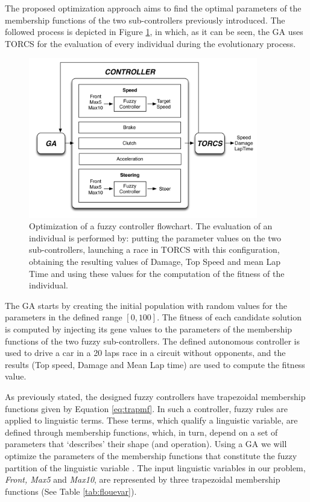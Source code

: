 \documentclass[conference]{IEEEtran}
\begin{document}
The proposed optimization approach aims to find the optimal parameters of the membership functions of the two sub-controllers previously introduced. 
The followed process is depicted in Figure \ref{fig:ga}, in which, as it can be seen, the GA uses TORCS for the evaluation of every individual during the evolutionary process.
\begin{figure}[!ht]
  \label{fig:ga}
  \begin{center}
    \includegraphics[width=10cm]{fig/flowchart}
  \end{center}
  \caption{Optimization of a fuzzy controller flowchart. The evaluation of an individual is performed by: putting the parameter values on the two sub-controllers, launching a race in TORCS with this configuration, obtaining the resulting values of Damage, Top Speed and mean Lap Time and using these values for the computation of the fitness of the individual.}
\end{figure}	
The GA starts by creating the initial population with random values
for the parameters in the defined range $[0,100]$. The fitness of each
candidate solution is computed by injecting its gene values to the
parameters of the membership functions of the two fuzzy
sub-controllers. The defined autonomous controller is used to drive a
car in a 20 laps race in a circuit without opponents, and the
results (Top speed, Damage and Mean Lap time) are used to compute the
fitness value. 


As previously stated, the designed fuzzy controllers have trapezoidal membership functions given by Equation \ref{eq:trapmf}.
In such a controller, fuzzy rules are applied to linguistic
terms. These terms, which qualify a linguistic variable, are defined
through membership functions, which, in turn, depend on a set of
parameters that `describes' their shape (and operation). Using a GA we
will optimize the parameters of the membership functions that
constitute the fuzzy partition of the linguistic variable
\cite{ThangG08}. The input linguistic variables in our problem,
\textit{Front, Max5} and \textit{Max10}, are represented by three
trapezoidal membership functions (See Table \ref{tab:flouevar}). %
\end{document}
